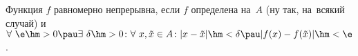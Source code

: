 
Функция $f$ равномерно непрерывна, если $f$ определена на~$A$ (ну так, на~всякий случай) и
$\forall\  \e\hm>0\pau \exists\  \delta\hm>0\colon
\forall\  x,\tilde x\in A\colon |x-\tilde x|\hm<\delta\pau |f(x)-f(\tilde x)|\hm<\e$.

